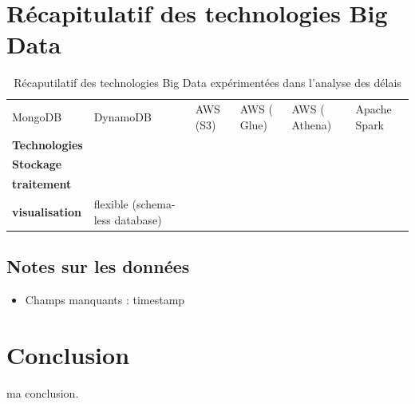 \section{Récapitulatif des technologies Big Data}

\begin{landscape}
	\begin{table}
		\centering
\begin{tabularx}{24cm}{ X X X XXX}
	
	
	
	MongoDB&DynamoDB &AWS (S3) &AWS ( Glue) &AWS ( Athena) &Apache Spark\\
	
	\textbf{Technologies}&&&&&\\
	
	 \textbf{Stockage} &&&&&\\
	 \textbf{traitement}&&&&&\\
	 \textbf{visualisation}&	  \LeftThumbsUp  flexible (schema-less database)
	 
	   \RightThumbsDown&&&&\\
  
\end{tabularx}
\caption{Récaputilatif des technologies Big Data expérimentées dans l'analyse des délais}
	\end{table}
\end{landscape}

\subsection{Notes sur les données}
\begin{itemize}
	\item Champs manquants : timestamp
\end{itemize}
\section{Conclusion}
ma conclusion.